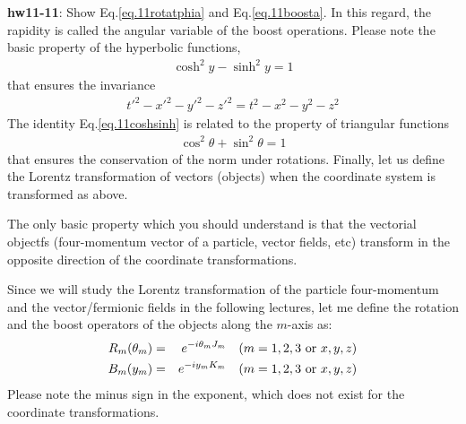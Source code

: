 \documentclass[12pt]{article}
\begin{document}
{\bf hw11-11}: Show Eq.\ref{eq.11rotatphia} and Eq.\ref{eq.11boosta}.
  In this regard, the rapidity is called the angular variable of the
  boost operations.  Please note the basic property of the hyperbolic
  functions,
\begin{eqnarray}
  \cosh^2 y - \sinh^2 y = 1 \label{eq.11coshsinh}
\end{eqnarray}
that ensures the invariance
\begin{eqnarray}
{t'}^2 - {x'}^2 - {y'}^2 - {z'}^2
= t^2   -  x^2   -  y^2   -  z^2
\end{eqnarray}
 The identity Eq.\ref{eq.11coshsinh} is related to the property of triangular functions
\begin{eqnarray}
  \cos^2\theta + \sin^2\theta = 1
\end{eqnarray}
  that ensures the conservation of the norm under rotations.
  Finally, let us define the Lorentz transformation of vectors (objects)
  when the coordinate system is transformed as above.

  The only basic property which you should understand is that the
  vectorial objectfs (four-momentum vector of a particle, vector fields,
  etc) transform in the opposite direction of the coordinate
  transformations.

  Since we will study the Lorentz transformation of the particle
  four-momentum and the vector/fermionic fields in the following
  lectures, let me define the rotation and the boost operators of
  the objects along the $m$-axis as:
\begin{eqnarray}
  R_m(\theta_m) &=& e^{ -i \theta_m J_m } ~~~ (m=1,2,3 ~{\rm or}~ x,y,z) \\
  B_m(y_m)      &=& e^{ -i y_m      K_m } ~~~(m=1,2,3 ~{\rm or}~x,y,z)
\end{eqnarray}
  Please note the minus sign in the exponent, which does not exist for
  the coordinate transformations.
\end{document}
